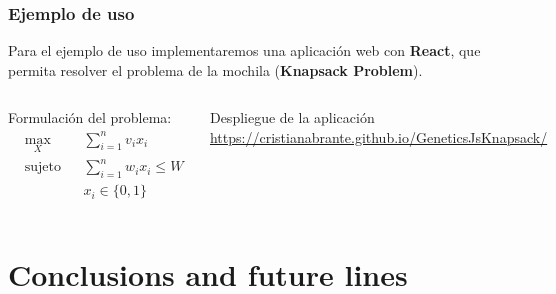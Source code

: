 \documentclass{beamer}
\begin{document}
\begin{frame}
\frametitle{Ejemplo de uso}

Para el ejemplo de uso implementaremos una aplicación web con \textbf{React}, que permita resolver el problema de la mochila (\textbf{Knapsack Problem}).

\bigskip

\begin{columns}
    Formulación del problema:
    \begin{equation*}
        \begin{aligned}
        & \underset{X}{\text{max}}
        & & \sum_{i=1}^n v_i x_i \\
        & \text{sujeto a}
        & & \sum_{i=1}^n w_i x_i \leq W \\
        &&& x_i \in \{0, 1\}
        \end{aligned}
    \end{equation*}
    \begin{block}{Despliegue de la aplicación}
     \url{https://cristianabrante.github.io/GeneticsJsKnapsack/}
    \end{block}
\end{columns}

\end{frame}

\section{Conclusions and future lines}
\end{document}
